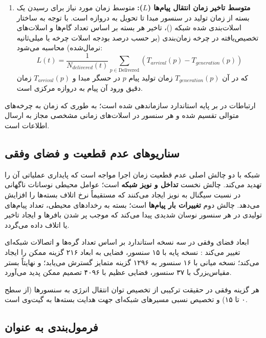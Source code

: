 \documentclass[oneside,openany,phd]{TMU-Thesis}
\begin{document}
\begin{enumerate}
    \item \textbf{متوسط تاخیر زمان انتقال پیام‌ها ($L$):}
    متوسط زمان مورد نیاز برای رسیدن یک بسته از زمان تولید در سنسور مبدا تا تحویل به دروازه است. با توجه به ساختار اسلات‌بندی شده شبکه ()، تاخیر هر بسته بر اساس تعداد گام‌ها و اسلات‌های تخصیص‌یافته در چرخه زمان‌بندی (بر حسب درصد بودجه اسلات چرخه یا میلی‌ثانیه نرمال‌شده) محاسبه می‌شود:
    \begin{equation}\label{eq:L_total}
        L(t) = \frac{1}{N_{delivered}(t)} \sum_{p \in \text{Delivered}} \left( T_{arrival}(p) - T_{generation}(p) \right)
    \end{equation}
    که در آن $T_{generation}(p)$ زمان تولید پیام $p$ در حسگر مبدا و $T_{arrival}(p)$ زمان دقیق ورود آن پیام به دروازه مرکزی است.
\end{enumerate}

ارتباطات در  بر پایه استاندارد  سازماندهی شده است؛ به طوری که زمان به چرخه‌های متوالی تقسیم شده و هر سنسور در اسلات‌های زمانی مشخصی مجاز به ارسال اطلاعات است.
\subsection{سناریوهای عدم قطعیت و فضای وفقی}

شبکه  با دو چالش اصلی عدم قطعیت زمان اجرا مواجه است که پایداری عملیاتی آن را تهدید می‌کند. چالش نخست \textbf{تداخل و نویز شبکه} است؛ عوامل محیطی نوسانات ناگهانی در نسبت سیگنال به نویز ایجاد می‌کنند که مستقیماً نرخ اتلاف بسته‌ها را افزایش می‌دهد. چالش دوم \textbf{تغییرات بار پیام‌ها} است؛ بسته به رخدادهای محیطی، تعداد پیام‌های تولیدی در هر سنسور نوسان شدیدی پیدا می‌کند که موجب پر شدن بافرها و ایجاد تاخیر یا اتلاف داده می‌گردد.

ابعاد فضای وفقی در سه نسخه استاندارد  بر اساس تعداد گره‌ها و اتصالات شبکه‌ای تغییر می‌کند \cite{gerostathopoulos2019deltaiot}: نسخه پایه  با ۱۵ سنسور، فضایی به ابعاد ۲۱۶ گزینه ممکن را ایجاد می‌کند؛ نسخه میانی  با ۱۶ سنسور به ۱۲۹۶ گزینه متمایز گسترش می‌یابد؛ و نهایتاً بستر مقیاس‌بزرگ  با ۳۷ سنسور، فضایی عظیم با ۴۰۹۶ تصمیم ممکن پدید می‌آورد.

هر گزینه وفقی در حقیقت ترکیبی از تخصیص توان انتقال انرژی به سنسورها (از سطح ۰ تا ۱۵) و تخصیص نسبی مسیرهای شبکه‌ای جهت هدایت بسته‌ها به گیت‌وی است.

\subsection{فرمول‌بندی به عنوان }
\end{document}
